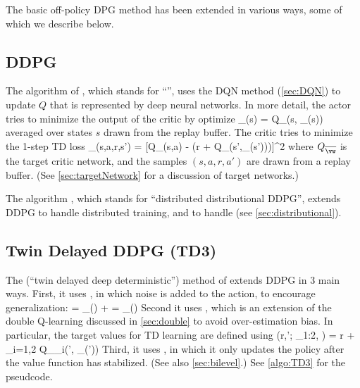 
The basic off-policy
DPG method has been extended in various ways,
some of which we describe below.

\subsection{DDPG}
\label{sec:DDPG}
\label{sec:D4PG}


The  algorithm of \citep{ddpg},
which stands for
``'',
uses  the DQN method (\cref{sec:DQN})
to update $Q$ that is represented by deep neural networks.
%
In more detail, the actor tries to minimize the output of the critic
by optimize
\be
\loss_{\vtheta}(s) = Q_{\vw}(s, \mu_{\vtheta}(s))
\ee
averaged over states $s$ drawn from the replay buffer.
The  critic tries to minimize
the 1-step TD loss
\be
\loss_{\vw}(s,a,r,s') =
[Q_{\vw}(s,a) - (r + \gamma Q_{\overline{\vw}}(s',\mu_{\vtheta}(s')))]^2
\ee
where $Q_{\overline{\vw}}$ is the target critic network,
and the samples $(s,a,r,a')$ are drawn from a replay buffer.
(See \cref{sec:targetNetwork} for a discussion of target networks.)

The  algorithm \citep{D4PG},
which stands for ``distributed distributional DDPG'',
extends DDPG to
handle distributed training,
and to handle 
(see \cref{sec:distributional}).


\subsection{Twin Delayed DDPG (TD3)}
\label{sec:TD3}

The   (``twin delayed deep deterministic'') method of
\citep{TD3}
extends DDPG  in 3 main ways.
First, it uses ,
in which noise is added to the action, to encourage generalization:
\be
\tilde{\va} = \vmu_{\vtheta}(\vs) + 
= \pi_{\vtheta}(\vs)
\ee
Second it uses ,
which is an extension of the double Q-learning discussed in
\cref{sec:double} to avoid
over-estimation bias.
In particular, the target values for TD learning are defined using
\be
\TargetV(r,\vs'; \overline{\vw}_{1:2}, \overline{\vtheta})
= r + \gamma \min_{i=1,2}
Q_{\overline{\vw}_i}(\vs', \pi_{\overline{\vtheta}}(\vs'))
\ee
Third, it uses ,
in which it only updates the policy after the value function
has stabilized. (See also \cref{sec:bilevel}.)
See \cref{algo:TD3} for the pseudcode.


